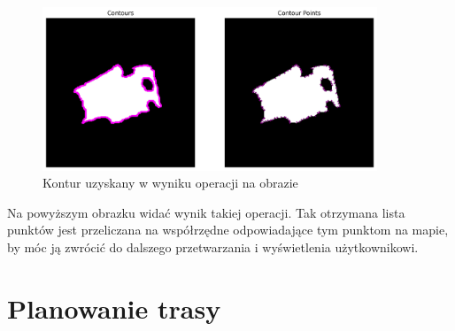 \begin{figure}[H]
    \centering
    \includegraphics[width=10cm]{images/Contour.jpg}
    \caption{Kontur uzyskany w wyniku operacji na obrazie}
\end{figure}

Na powyższym obrazku widać wynik takiej operacji. Tak otrzymana lista punktów jest przeliczana na współrzędne odpowiadające tym punktom na mapie, by móc ją zwrócić do dalszego przetwarzania i wyświetlenia użytkownikowi.

\section{Planowanie trasy}

